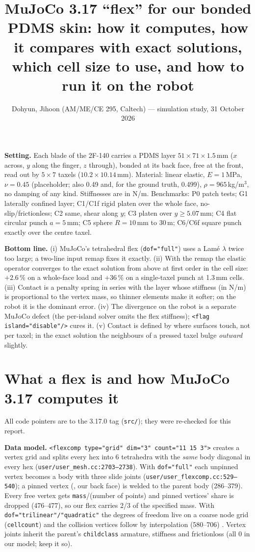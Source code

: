\documentclass[10pt,twocolumn]{article}
\title{\vspace{-4mm}\large\textbf{MuJoCo 3.17 ``flex'' for our bonded PDMS skin: how it computes, how it compares with
exact solutions,\\ which cell size to use, and how to run it on the robot}\vspace{-2mm}}
\author{\small Dohyun, Jihoon \quad (AM/ME/CE 295, Caltech) \quad --- simulation study, 31 October 2026}
\date{\vspace{-7mm}}
\newcommand{\code}[1]{\texttt{\small #1}}
\newcommand{\src}[1]{\texttt{\footnotesize #1}}
\newcommand{\Nu}{N/\textmu m}
\newcommand{\um}{\,\textmu m}
\begin{document}
\maketitle

\noindent\textbf{Setting.} Each blade of the 2F-140 carries a PDMS layer $51\times71\times1.5$\,mm ($x$ across, $y$
along the finger, $z$ through), bonded at its back face, free at the front, read out by $5\times7$ taxels
($10.2\times10.14$\,mm). Material: linear elastic, $E=1$\,MPa, $\nu=0.45$ (placeholder; also 0.49 and, for the
ground truth, 0.499), $\rho=965$\,kg/m$^3$, no damping of any kind. Stiffnesses are in \Nu. Benchmarks:
P0 patch tests; G1 laterally confined layer; C1/C1f rigid platen over the whole face, no-slip/frictionless; C2
same, shear along $y$; C3 platen over $y\ge5.07$\,mm; C4 flat circular punch $a=5$\,mm; C5 sphere $R=10$\,mm to
30\um; C6/C6f square punch exactly over the centre taxel.

\noindent\textbf{Bottom line.} (i) MuJoCo's tetrahedral flex (\code{dof="full"}) uses a Lam\'e $\lambda$ twice too
large; a two-line input remap fixes it exactly. (ii) With the remap the elastic operator converges to the exact
solution from above at first order in the cell size: $+2.6$\,\% on a whole-face load and $+36$\,\% on a single-taxel
punch at 1.3\,mm cells. (iii) Contact is a penalty spring in series with the layer whose stiffness (in N/m) is
proportional to the vertex mass, so thinner elements make it softer; on the robot it is the dominant error. (iv) The
divergence on the robot is a separate MuJoCo defect (the per-island solver omits the flex stiffness);
\code{<flag island="disable"/>} cures it. (v) Contact is defined by where surfaces touch, not per taxel; in the exact
solution the neighbours of a pressed taxel bulge \emph{outward} slightly.

\section{What a flex is and how MuJoCo 3.17 computes it}
\label{sec:internals}
All code pointers are to the 3.17.0 tag (\src{src/}); they were re-checked for this report.

\textbf{Data model.} \code{<flexcomp type="grid" dim="3" count="11 15 3">} creates a vertex grid and splits every
hex into 6 tetrahedra with the \emph{same} body diagonal in every hex (\src{user/user\_mesh.cc:2703--2738}). With
\code{dof="full"} each unpinned vertex becomes a body with three slide joints (\src{user/user\_flexcomp.cc:529--540});
a pinned vertex (\code{<pin gridrange>}, our back face) is welded to the parent body (286--379). Every free vertex
gets \code{mass}/(number of points) and pinned vertices' share is dropped (476--477), so our flex carries 2/3 of the
specified mass. With \code{dof="trilinear"/"quadratic"} the degrees of freedom live on a coarse node grid
(\code{cellcount}) and the collision vertices follow by interpolation (580--706) \cite{mjdoc}.
Vertex joints inherit the parent's \code{childclass} armature, stiffness and frictionloss (all 0 in our model; keep
it so).
\end{document}
